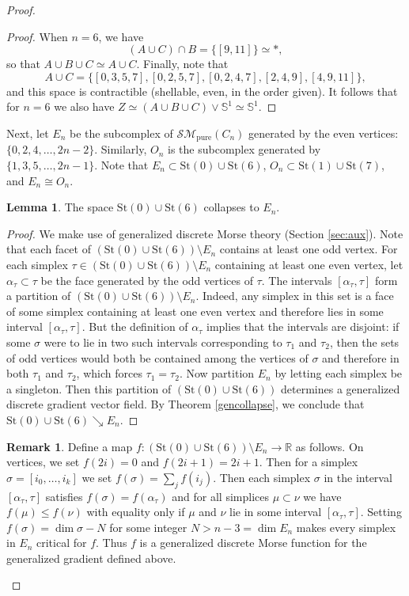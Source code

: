 \documentclass{amsart}
\theoremstyle{definition}
\newtheorem{lemma}[theorem]{Lemma}
\newtheorem{remark}[theorem]{Remark}
\newcommand{\zr}{{\mathbb R}}
\newcommand{\zs}{{\mathbb S}}
\newcommand{\smpure}{{\mathcal{SM}}_{\textrm{pure}}}
\begin{document}
\begin{proof}
\begin{proof}
    When $n=6$, we have $$(A\cup C)\cap B = \{[9,11]\} \simeq \ast,$$ so that $A\cup B \cup C \simeq A\cup C$. Finally, note  that $$A\cup C = \{[0,3,5,7],[0,2,5,7],[0,2,4,7],[2,4,9],[4,9,11]\},$$  and this space is contractible (shellable, even, in the order given). It follows that for $n=6$ we also have $Z\simeq (A\cup B\cup C) \vee \zs^1 \simeq \zs^1$.
\end{proof}

Next, let $E_n$  be the subcomplex of $\smpure(C_n)$ generated by the even vertices: $\{0,2,4,\dots,2n-2\}$. Similarly, $O_n$ is the subcomplex generated by $\{1,3,5,\dots,2n-1\}$. Note that $E_n\subset \text{St}(0)\cup\text{St}(6)$, $O_n\subset \text{St}(1)\cup\text{St}(7)$, and $E_n\cong O_n$. 

\begin{lemma}\label{lem:endefretract} The space $\text{St}(0)\cup \text{St}(6)$ collapses to $E_n$.
\end{lemma}

\begin{proof}
    We make use of generalized discrete Morse theory (Section \ref{sec:aux}). Note that each facet of $(\text{St}(0)\cup\text{St}(6))\setminus E_n$ contains at least one odd vertex.  For each simplex $\tau\in(\text{St}(0)\cup\text{St}(6))\setminus E_n$ containing at least one even vertex, let $\alpha_\tau\subset\tau$ be the face generated by the odd vertices of $\tau$. The intervals $[\alpha_\tau,\tau]$ form a partition of $(\text{St}(0)\cup\text{St}(6))\setminus E_n$. Indeed, any simplex in this set is a face of some simplex containing at least one even vertex and therefore lies in some interval $[\alpha_\tau,\tau]$. But the definition of $\alpha_\tau$ implies that the intervals are disjoint: if some $\sigma$ were to lie in two such intervals corresponding to $\tau_1$ and $\tau_2$, then the sets of odd vertices would both be contained among the vertices of $\sigma$ and therefore in both $\tau_1$ and $\tau_2$, which forces $\tau_1=\tau_2$. Now partition $E_n$ by letting each simplex be a singleton.  Then this partition of $(\text{St}(0)\cup\text{St}(6))$ determines a generalized discrete gradient vector field. By Theorem \ref{gencollapse}, we conclude that $\text{St}(0)\cup\text{St}(6)\searrow E_n$.
\end{proof}

\begin{remark}
    Define a map $f:(\text{St}(0)\cup\text{St}(6))\setminus E_n\to\zr$ as follows. On vertices, we set $f(2i)=0$ and $f(2i+1)=2i+1$. Then for a simplex $\sigma = [i_0,\dots ,i_k]$ we set $f(\sigma)=\sum_jf(i_j)$. Then each simplex $\sigma$ in the interval $[\alpha_\tau,\tau]$ satisfies $f(\sigma)=f(\alpha_\tau)$ and for all simplices $\mu\subset \nu$ we have $f(\mu)\le f(\nu)$ with equality only if $\mu$ and $\nu$ lie in some interval $[\alpha_\tau,\tau]$. Setting $f(\sigma)=\dim\sigma - N$ for some integer $N>n-3 = \dim E_n$ makes every simplex in $E_n$ critical for $f$. Thus $f$ is a generalized discrete Morse function for the generalized gradient defined above.
\end{remark}



\end{proof}
\end{document}

